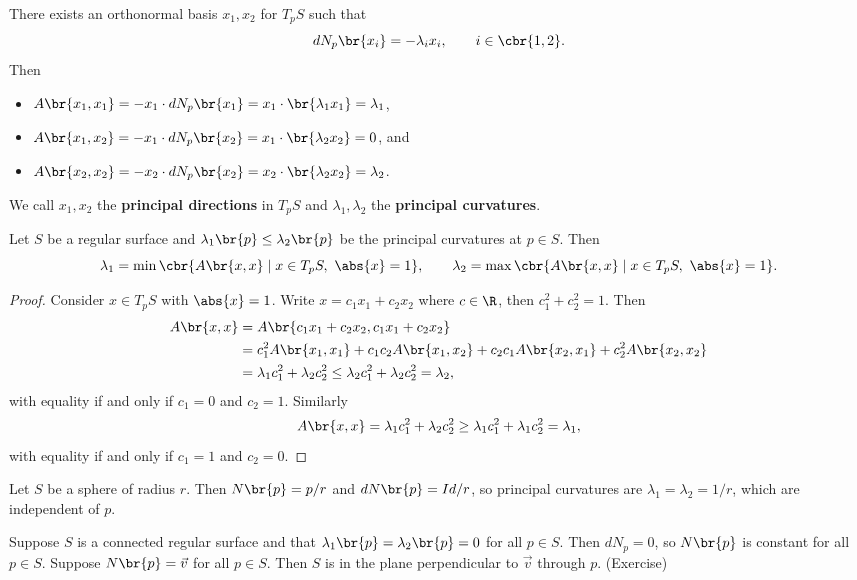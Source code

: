 
There exists an orthonormal basis $ x_1, x_2 $ for $ T_pS $ such that
$$ dN_p\br{x_i} = -\lambda_ix_i, \qquad i \in \cbr{1, 2}. $$
Then
\begin{itemize}
\item $ A\br{x_1, x_1} = -x_1 \cdot dN_p\br{x_1} = x_1 \cdot \br{\lambda_1x_1} = \lambda_1 $,
\item $ A\br{x_1, x_2} = -x_1 \cdot dN_p\br{x_2} = x_1 \cdot \br{\lambda_2x_2} = 0 $, and
\item $ A\br{x_2, x_2} = -x_2 \cdot dN_p\br{x_2} = x_2 \cdot \br{\lambda_2x_2} = \lambda_2 $.
\end{itemize}
We call $ x_1, x_2 $ the \textbf{principal directions} in $ T_pS $ and $ \lambda_1, \lambda_2 $ the \textbf{principal curvatures}.

\begin{lemma}
Let $ S $ be a regular surface and $ \lambda_1\br{p} \le \lambda_2\br{p} $ be the principal curvatures at $ p \in S $. Then
$$ \lambda_1 = \min\cbr{A\br{x, x} \mid x \in T_pS, \ \abs{x} = 1}, \qquad \lambda_2 = \max\cbr{A\br{x, x} \mid x \in T_pS, \ \abs{x} = 1}. $$
\end{lemma}

\begin{proof}
Consider $ x \in T_pS $ with $ \abs{x} = 1 $. Write $ x = c_1x_1 + c_2x_2 $ where $ c \in \R $, then $ c_1^2 + c_2^2 = 1 $. Then
\begin{align*}
A\br{x, x}
& = A\br{c_1x_1 + c_2x_2, c_1x_1 + c_2x_2} \\
& = c_1^2A\br{x_1, x_1} + c_1c_2A\br{x_1, x_2} + c_2c_1A\br{x_2, x_1} + c_2^2A\br{x_2, x_2} \\
& = \lambda_1c_1^2 + \lambda_2c_2^2 \le \lambda_2c_1^2 + \lambda_2c_2^2 = \lambda_2,
\end{align*}
with equality if and only if $ c_1 = 0 $ and $ c_2 = 1 $. Similarly
$$ A\br{x, x} = \lambda_1c_1^2 + \lambda_2c_2^2 \ge \lambda_1c_1^2 + \lambda_1c_2^2 = \lambda_1, $$
with equality if and only if $ c_1 = 1 $ and $ c_2 = 0 $.
\end{proof}

\begin{example*}
Let $ S $ be a sphere of radius $ r $. Then $ N\br{p} = p / r $ and $ dN\br{p} = Id / r $, so principal curvatures are $ \lambda_1 = \lambda_2 = 1 / r $, which are independent of $ p $.
\end{example*}

\begin{example*}
Suppose $ S $ is a connected regular surface and that $ \lambda_1\br{p} = \lambda_2\br{p} = 0 $ for all $ p \in S $. Then $ dN_p = 0 $, so $ N\br{p} $ is constant for all $ p \in S $. Suppose $ N\br{p} = \vec{v} $ for all $ p \in S $. Then $ S $ is in the plane perpendicular to $ \vec{v} $ through $ p $. (Exercise)
\end{example*}

